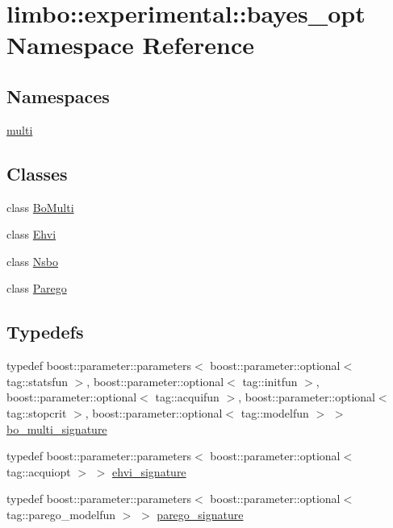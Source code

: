 \hypertarget{namespacelimbo_1_1experimental_1_1bayes__opt}{}\section{limbo\+:\+:experimental\+:\+:bayes\+\_\+opt Namespace Reference}
\label{namespacelimbo_1_1experimental_1_1bayes__opt}
\subsection*{Namespaces}
\begin{DoxyCompactItemize}
\item 
 \hyperlink{namespacelimbo_1_1experimental_1_1bayes__opt_1_1multi}{multi}
\end{DoxyCompactItemize}
\subsection*{Classes}
\begin{DoxyCompactItemize}
\item 
class \hyperlink{classlimbo_1_1experimental_1_1bayes__opt_1_1_bo_multi}{Bo\+Multi}
\item 
class \hyperlink{classlimbo_1_1experimental_1_1bayes__opt_1_1_ehvi}{Ehvi}
\item 
class \hyperlink{classlimbo_1_1experimental_1_1bayes__opt_1_1_nsbo}{Nsbo}
\item 
class \hyperlink{classlimbo_1_1experimental_1_1bayes__opt_1_1_parego}{Parego}
\end{DoxyCompactItemize}
\subsection*{Typedefs}
\begin{DoxyCompactItemize}
\item 
typedef boost\+::parameter\+::parameters$<$ boost\+::parameter\+::optional$<$ tag\+::statsfun $>$, boost\+::parameter\+::optional$<$ tag\+::initfun $>$, boost\+::parameter\+::optional$<$ tag\+::acquifun $>$, boost\+::parameter\+::optional$<$ tag\+::stopcrit $>$, boost\+::parameter\+::optional$<$ tag\+::modelfun $>$ $>$ \hyperlink{namespacelimbo_1_1experimental_1_1bayes__opt_a917a3d4ba3c92a91c3664f9e3ab91057}{bo\+\_\+multi\+\_\+signature}
\item 
typedef boost\+::parameter\+::parameters$<$ boost\+::parameter\+::optional$<$ tag\+::acquiopt $>$ $>$ \hyperlink{namespacelimbo_1_1experimental_1_1bayes__opt_aa9273d3d9c89937c8da1850d0174d3ff}{ehvi\+\_\+signature}
\item 
typedef boost\+::parameter\+::parameters$<$ boost\+::parameter\+::optional$<$ tag\+::parego\+\_\+modelfun $>$ $>$ \hyperlink{namespacelimbo_1_1experimental_1_1bayes__opt_aa1bdc78504860120d6bc0f395f986f57}{parego\+\_\+signature}
\end{DoxyCompactItemize}


